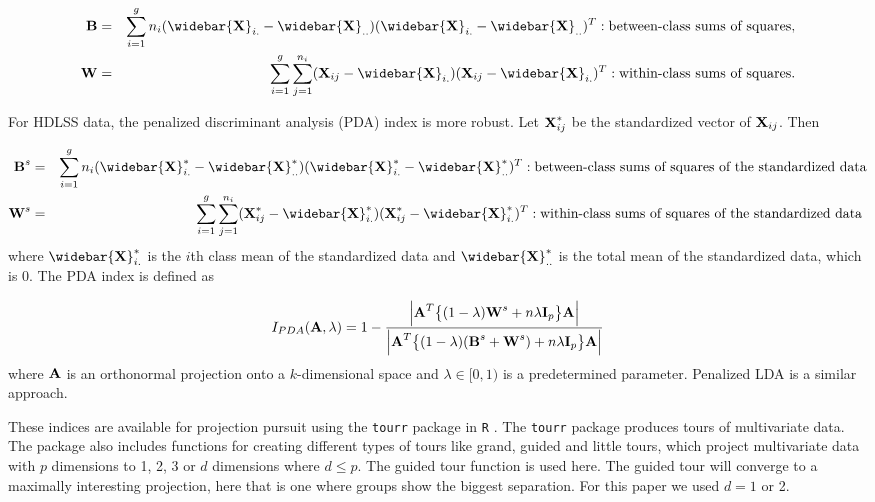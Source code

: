 \begin{eqnarray}
 \blB&=&\sum_{i=1}^g n_i (\widebar{\blX}_{i.} - \widebar{\blX}_{..})(\widebar{\blX}_{i.}
  - \widebar{\blX}_{..})^T
:  \mbox{between-class sums of squares}, \nonumber\\
\blW&=&\sum_{i=1}^g \sum_{j=1}^{n_i} (\blX_{ij} -
\widebar{\blX}_{i.})(\blX_{ij} - \widebar{\blX}_{i.})^T :
\mbox{within-class sums of squares}.\nonumber
\end{eqnarray}

For HDLSS data, the penalized discriminant analysis (PDA) index \citep{lee:2009} is more robust. Let ${\mbox{\boldmath {\bf X}}}_{ij}^*$ be the standardized vector of ${\mbox{\boldmath {\bf X}}}_{ij}$. Then 

\begin{eqnarray}
 \blB^s&=&\sum_{i=1}^g n_i (\widebar{\blX}^*_{i.} - \widebar{\blX}^*_{..})(\widebar{\blX}^*_{i.}
  - \widebar{\blX}^*_{..})^T: \hbox{between-class sums of squares of the standardized data}\nonumber\\
\blW^s&=&\sum_{i=1}^g \sum_{j=1}^{n_i} (\blX^*_{ij} -
\widebar{\blX}^*_{i.})(\blX^*_{ij} - \widebar{\blX}^*_{i.})^T: \hbox{within-class sums of squares of the standardized data }\nonumber
\end{eqnarray}
where $\widebar{\blX}^*_{i.}$ is the $i$th class mean of the standardized data and $\widebar{\blX}^*_{..}$ is the
total mean of the standardized data, which is 0. The PDA index is defined as

\begin{eqnarray}
I_{PDA}(\mbox{\boldmath {\bf A}},\lambda) =
1-\frac{\Big|\mbox{\boldmath {\bf A}}^T\big\{(1-\lambda)\mbox{\boldmath {\bf W}}^s+n\lambda\mbox{\boldmath {\bf I}}_p\big\}
\mbox{\boldmath {\bf A}}\Big|}
              {\Big|\mbox{\boldmath {\bf A}}^T\big\{(1-\lambda)(\mbox{\boldmath {\bf B}}^s +\mbox{\boldmath {\bf W}}^s)+n\lambda\mbox{\boldmath {\bf I}}_p\big\} \mbox{\boldmath {\bf A}}\Big|}\label{PDA3}
\end{eqnarray}
where $\mbox{\boldmath {\bf A}}$ is an orthonormal projection onto a $k$-dimensional space
and $\lambda \in [0,1)$ is a predetermined parameter. Penalized LDA \citep{witten:2011} is a similar approach.

These indices are available for projection pursuit using the \texttt{tourr} package \citep{tourr:2011} in \texttt{R} \citep{r}. The \texttt{tourr} package produces tours of multivariate data. The package also includes functions for creating different types of tours like grand, guided and little tours, which project multivariate data with $p$ dimensions to 1, 2, 3 or $d$ dimensions where $d \le p$. The guided tour function is used here. The guided tour will converge to a maximally interesting projection, here that is one where groups show the biggest separation. For this paper we used $d = 1$ or 2.  

